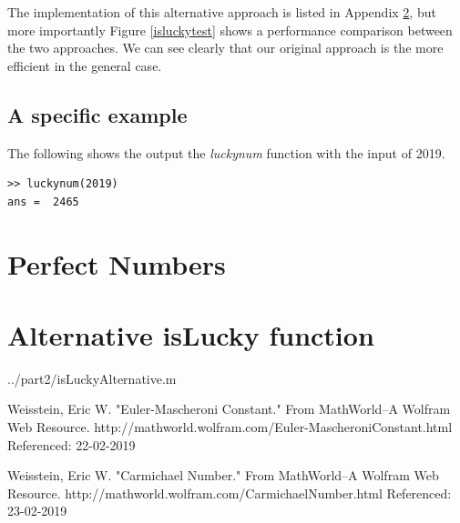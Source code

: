 \documentclass[10pt]{article}
\begin{document}
The implementation of this alternative approach is listed in Appendix \ref{islucky_appendix}, but more importantly Figure \ref{isluckytest} shows a performance comparison between the two approaches. We can see clearly that our original approach is the more efficient in the general case.

\subsection{A specific example}

The following shows the output the \emph{luckynum} function with the input of 2019.

\begin{verbatim}
>> luckynum(2019)
ans =  2465
\end{verbatim}
\begin{appendices}

\section{Perfect Numbers}
\section{Alternative isLucky function}\label{islucky_appendix}

   {../part2/isLuckyAlternative.m}
  
\end{appendices}

\begin{thebibliography}{9}
Weisstein, Eric W. "Euler-Mascheroni Constant." From MathWorld--A Wolfram Web Resource. http://mathworld.wolfram.com/Euler-MascheroniConstant.html
Referenced: 22-02-2019

Weisstein, Eric W. "Carmichael Number." From MathWorld--A Wolfram Web Resource. http://mathworld.wolfram.com/CarmichaelNumber.html
Referenced: 23-02-2019

\end{thebibliography}
\end{document}
